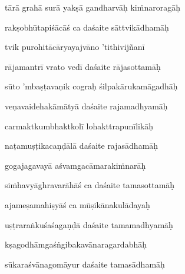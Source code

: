 tārā grahā surā yakṣā gandharvāḥ ki\.mnaroragāḥ\thinspace{\dandab} \dontdisplaylinenum

rakṣobhūtapiśācāś ca daśaite sāttvikādhamāḥ \veg\dontdisplaylinenum

tvik purohitācāryayajvāno 'tithivijñanī\thinspace{\dandab} \dontdisplaylinenum

rājamantrī vrato vedī daśaite rājasottamāḥ \veg\dontdisplaylinenum

sūto 'mbaṣṭavaṇik cograḥ śilpakārukamāgadhāḥ\thinspace{\dandab} \dontdisplaylinenum

veṇavaidehakāmātyā daśaite rajamadhyamāḥ \veg\dontdisplaylinenum

carmaktkumbhaktkolī lohakttrapunīlikāḥ\thinspace{\dandab} \dontdisplaylinenum

naṭamuṣṭikacaṇḍālā daśaite rajasādhamāḥ \veg\dontdisplaylinenum

gogajagavayā aśvamgacāmaraki\.mnarāḥ\thinspace{\dandab} \dontdisplaylinenum

si\.mhavyāghravarāhāś ca daśaite tamasottamāḥ \veg\dontdisplaylinenum

ajameṣamahiṣyāś ca mūṣikānakulādayaḥ\thinspace{\dandab} \dontdisplaylinenum

uṣṭraraṅkuśaśagaṇḍā daśaite tamamadhyamāḥ \veg\dontdisplaylinenum

kṣagodhāmgaśṅgibakavānaragardabhāḥ\thinspace{\dandab} \dontdisplaylinenum

sūkaraśvānagomāyur daśaite tamasādhamāḥ \veg\dontdisplaylinenum

